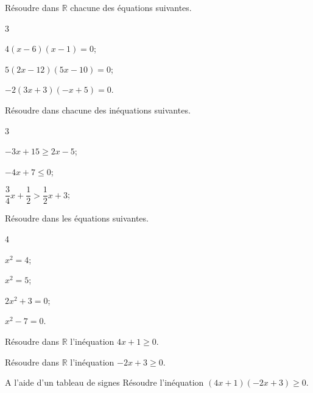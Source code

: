 \documentclass[11pt,a4paper]{article}  %
\begin{document}

Résoudre dans $\mathbb{R}$ chacune des équations suivantes.
\begin{multicols}{3}
	\begin{enumMet}
		\item $4(x-6)(x-1)=0$;
		\item $5(2x-12)(5x-10)=0$;
		\item $-2(3 x+3)(-x+5)=0$.
	\end{enumMet}
\end{multicols}


Résoudre dans \R chacune des inéquations suivantes.
\begin{multicols}{3}
	\begin{enumMet}
		\item $-3 x +15 \geqslant 2x-5$;
		\item $-4 x+7 \leqslant 0$;
		\item $\dfrac{3}{4} x+\dfrac{1}{2} > \dfrac{1}{2}x+3$;
	\end{enumMet}
\end{multicols}


Résoudre dans \R les équations suivantes.
\begin{multicols}{4}
	\begin{enumMet}
		\item $x^{2}=4$;
		\item $x^{2}=5$;
		\item $2 x^{2}+3=0$;
		\item $x^{2}-7=0$.
	\end{enumMet}
\end{multicols}


\begin{enumMet}
	\item Résoudre dans $\mathbb{R}$ l'inéquation $4 x+1 \geqslant 0$.
	\item Résoudre dans $\mathbb{R}$ l'inéquation $-2 x+3 \geqslant 0$.
	\item A l'aide d'un tableau de signes Résoudre l'inéquation $(4 x+1)(-2 x+3)\geqslant0$.
\end{enumMet}
\end{document}

